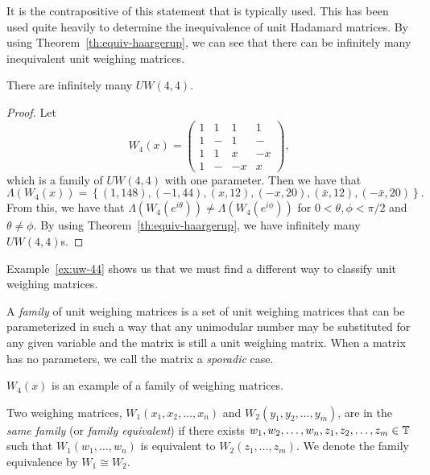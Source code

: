 It is the contrapositive of this statement that is typically used. This has been used quite heavily to determine the inequivalence of unit Hadamard matrices. By using Theorem~\ref{th:equiv-haargerup}, we can see that there can be infinitely many inequivalent unit weighing matrices.

\begin{example} \label{ex:uw-44}
 There are infinitely many $UW(4,4)$.

 \begin{proof}
  Let $$W_4(x) = \left(\begin{array}{rrrr}1&1&1&1\\1&-&1&-\\1&1&x&-x\\1&-&-x&x\end{array}\right),$$ which is a family of $UW(4,4)$ with one parameter. Then we have that $$\Lambda\left(W_4(x)\right) = \left\{(1,148),(-1,44),(x,12),(-x,20),(\bar{x},12),(-\bar{x},20)\right\}.$$ From this, we have that $\Lambda\left(W_4(e^{i\theta})\right) \neq \Lambda\left(W_4(e^{i\phi})\right)$ for $0 < \theta,\phi < \pi/2$ and $\theta \neq \phi$. By using Theorem~\ref{th:equiv-haargerup}, we have infinitely many $UW(4,4)$s.
 \end{proof}
\end{example}

Example~\ref{ex:uw-44} shows us that we must find a different way to classify unit weighing matrices.

\begin{definition} \label{def:family}
 A {\it family} of unit weighing matrices is a set of unit weighing matrices that can be parameterized in such a way that any unimodular number may be substituted for any given variable and the matrix is still a unit weighing matrix. When a matrix has no parameters, we call the matrix a {\it sporadic} case.
\end{definition}

$W_4(x)$ is an example of a family of weighing matrices.

\begin{definition} \label{def:family-equiv}
 Two weighing matrices, $W_1(x_1,x_2,\dots,x_n)$ and $W_2(y_1,y_2,\dots,y_m)$, are in the {\it same family} (or {\it family equivalent}) if there exists $w_1,w_2,\dots,w_n,z_1,z_2,\dots,z_m \in \mathbb{T}$ such that $W_1(w_1,\dots,w_n)$ is equivalent to $W_2(z_1,\dots,z_m)$. We denote the family equivalence by $W_1 \cong W_2$.
\end{definition}

